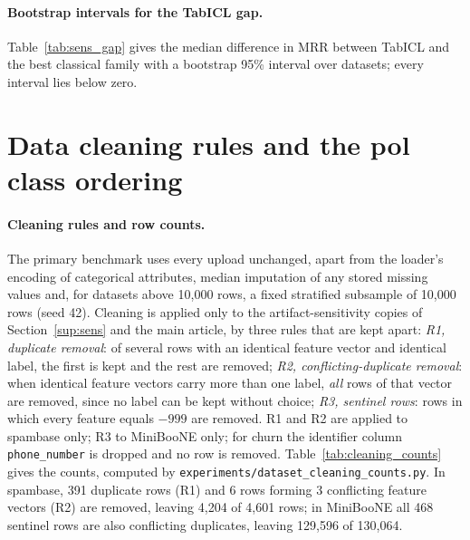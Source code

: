 \documentclass[pdflatex,sn-mathphys]{sn-jnl}
\theoremstyle{thmstyleone}
\begin{document}
\paragraph{Bootstrap intervals for the TabICL gap.} Table~\ref{tab:sens_gap} gives the median difference in MRR between TabICL and the best classical family with a bootstrap 95\% interval over datasets; every interval lies below zero.



\clearpage
\section{Data cleaning rules and the pol class ordering}\label{sup:cleaning}

\paragraph{Cleaning rules and row counts.} The primary benchmark uses every upload unchanged, apart from the loader's encoding of categorical attributes, median imputation of any stored missing values and, for datasets above 10{,}000 rows, a fixed stratified subsample of 10{,}000 rows (seed 42). Cleaning is applied only to the artifact-sensitivity copies of Section~\ref{sup:sens} and the main article, by three rules that are kept apart: \emph{R1, duplicate removal}: of several rows with an identical feature vector and identical label, the first is kept and the rest are removed; \emph{R2, conflicting-duplicate removal}: when identical feature vectors carry more than one label, \emph{all} rows of that vector are removed, since no label can be kept without choice; \emph{R3, sentinel rows}: rows in which every feature equals $-999$ are removed. R1 and R2 are applied to spambase only; R3 to MiniBooNE only; for churn the identifier column \texttt{phone\_number} is dropped and no row is removed. Table~\ref{tab:cleaning_counts} gives the counts, computed by \texttt{experiments/dataset\_cleaning\_counts.py}. In spambase, 391 duplicate rows (R1) and 6 rows forming 3 conflicting feature vectors (R2) are removed, leaving 4{,}204 of 4{,}601 rows; in MiniBooNE all 468 sentinel rows are also conflicting duplicates, leaving 129{,}596 of 130{,}064.


\end{document}
